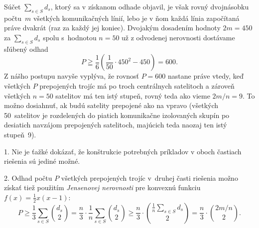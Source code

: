 {Súčet $\sum_{s\in S} d_s$, ktorý sa v získanom odhade objavil,
je však rovný dvojnásobku počtu~$m$ všetkých komunikačných línií,
lebo je v ňom každá línia započítaná práve dvakrát
(raz za každý jej koniec). Dvojakým
dosadením hodnoty $2m=450$ za $\sum_{s\in S} d_s$ spolu s~hodnotou $n=50$ už z odvodenej nerovnosti dostávame sľúbený odhad
$$
P\geqq \frac16\left(\frac1{50}\cdot450^2-450\right)=600.
$$
Z nášho postupu navyše vyplýva, že rovnosť $P=600$ nastane
práve vtedy, keď všetkých $P$ prepojených trojíc má po troch
centrálnych satelitoch a zároveň všetkých $n=50$
satelitov má ten istý stupeň, rovný teda ako vieme
$2m/n=9$.
To možno dosiahnuť, ak budú satelity prepojené
ako na  vpravo (všetkých 50~satelitov je rozdelených do
piatich komunikačne izolovaných skupín
po desiatich navzájom prepojených satelitoch, majúcich teda naozaj
ten istý stupeň~9).

\poznamky
\nopagebreak
\item{1.}
Nie je ťažké dokázať, že konštrukcie potrebných príkladov v oboch
častiach riešenia sú jediné možné.

\item{2.}
Odhad počtu $P$ všetkých prepojených trojíc v~druhej časti
riešenia možno získať tiež použitím {\it Jensenovej nerovnosti\/}
pre konvexnú funkciu
$f(x)=\frac12x(x-1)$:
$$
P\ge\frac13\sum_{s\in S}\binom{d_s}2
= \frac n3\cdot \frac1n\sum_{s\in S}\binom{d_s}2\ge
\frac n3\cdot\binom{\frac1n\sum_{ s\in S}d_s}{2}
= \frac n3\cdot\binom{2m/n}2.
$$
}

